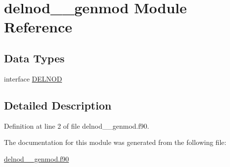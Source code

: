 \hypertarget{classdelnod____genmod}{\section{delnod\+\_\+\+\_\+genmod Module Reference}
\label{classdelnod____genmod}
}
\subsection*{Data Types}
\begin{DoxyCompactItemize}
\item 
interface \hyperlink{interfacedelnod____genmod_1_1DELNOD}{D\+E\+L\+N\+O\+D}
\end{DoxyCompactItemize}


\subsection{Detailed Description}


Definition at line 2 of file delnod\+\_\+\+\_\+genmod.\+f90.



The documentation for this module was generated from the following file\+:\begin{DoxyCompactItemize}
\item 
\hyperlink{delnod____genmod_8f90}{delnod\+\_\+\+\_\+genmod.\+f90}\end{DoxyCompactItemize}
